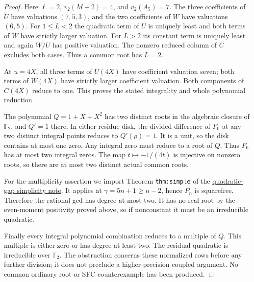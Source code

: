 \documentclass[11pt]{article}
\begin{document}
\begin{proof}
Here $\ell=2$, $v_2(M+2)=4$, and $v_2(A_5)=7$.
The three coefficients of $U$ have valuations $(7,5,3)$,
and the two coefficients of $W$ have valuations $(6,5)$.
For $1\le L<2$ the quadratic term of $U$ is uniquely least and
both terms of $W$ have strictly larger valuation.
For $L>2$ its constant term is uniquely least and again $W/U$
has positive valuation. The nonzero reduced column of $C$
excludes both cases. Thus a common root has $L=2$.

At $u=4X$, all three terms of $U(4X)$ have coefficient valuation
seven; both terms of $W(4X)$ have strictly larger coefficient
valuation. Both components of $C(4X)$ reduce to one.
This proves the stated integrality and whole polynomial reduction.

The polynomial $Q=1+X+X^2$ has two distinct roots in the algebraic
closure of $\mathbb F_2$, and $Q'=1$ there. In either residue disk,
the divided difference of $F_0$ at any two distinct integral points
reduces to $Q'(\rho)=1$. It is a unit, so the disk contains at most
one zero. Any integral zero must reduce to a root of $Q$.
Thus $F_0$ has at most two integral zeros.
The map $t\mapsto-1/(4t)$ is injective on nonzero roots, so there are
at most two distinct actual common roots.

For the multiplicity assertion we import Theorem
\texttt{thm:simple} of the
\href{CUBIC_ADJOINT_STABILITY_SFC.tex}{quadratic-gap simplicity note}.
It applies at $\gamma=5n+1\ge n-2$, hence $P_n$ is squarefree.
Therefore the rational gcd has degree at most two.
It has no real root by the even-moment positivity proved above,
so if nonconstant it must be an irreducible quadratic.

Finally every integral polynomial combination reduces to a multiple
of $Q$. This multiple is either zero or has degree at least two.
The residual quadratic is irreducible over $\mathbb F_2$.
The obstruction concerns these normalized rows before any further
division; it does not preclude a higher-precision coupled argument.
No common ordinary root or SFC counterexample has been produced.
\end{proof}
\end{document}
